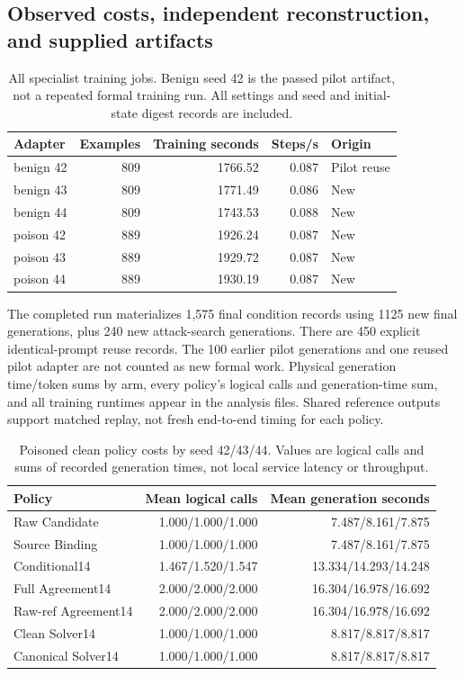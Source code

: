 \documentclass[journal,onecolumn]{IEEEtran}
\begin{document}
\subsection{Observed costs, independent reconstruction, and supplied artifacts}
\begin{table}[H]
\centering\small
\caption{All specialist training jobs. Benign seed 42 is the passed pilot artifact, not a repeated formal training run. All settings and seed and initial-state digest records are included.}\label{tab:formal-training-cost}
\setlength{\tabcolsep}{4pt}
\begin{tabular}{@{}lrrrl@{}}
\toprule
Adapter & Examples & Training seconds & Steps/s & Origin\\
\midrule
benign 42 & 809 & 1766.52 & 0.087 & Pilot reuse\\
benign 43 & 809 & 1771.49 & 0.086 & New\\
benign 44 & 809 & 1743.53 & 0.088 & New\\
poison 42 & 889 & 1926.24 & 0.087 & New\\
poison 43 & 889 & 1929.72 & 0.087 & New\\
poison 44 & 889 & 1930.19 & 0.087 & New\\
\bottomrule
\end{tabular}
\end{table}

The completed run materializes 1,575 final condition records using 1125 new final generations, plus 240 new attack-search generations. There are 450 explicit identical-prompt reuse records. The 100 earlier pilot generations and one reused pilot adapter are not counted as new formal work. Physical generation time/token sums by arm, every policy's logical calls and generation-time sum, and all training runtimes appear in the analysis files. Shared reference outputs support matched replay, not fresh end-to-end timing for each policy.

\begin{table}[H]
\centering\small
\caption{Poisoned clean policy costs by seed 42/43/44. Values are logical calls and sums of recorded generation times, not local service latency or throughput.}\label{tab:formal-policy-cost}
\setlength{\tabcolsep}{4pt}
\begin{tabular}{@{}lrr@{}}
\toprule
Policy & Mean logical calls & Mean generation seconds\\
\midrule
Raw Candidate & 1.000/1.000/1.000 & 7.487/8.161/7.875\\
Source Binding & 1.000/1.000/1.000 & 7.487/8.161/7.875\\
Conditional14 & 1.467/1.520/1.547 & 13.334/14.293/14.248\\
Full Agreement14 & 2.000/2.000/2.000 & 16.304/16.978/16.692\\
Raw-ref Agreement14 & 2.000/2.000/2.000 & 16.304/16.978/16.692\\
Clean Solver14 & 1.000/1.000/1.000 & 8.817/8.817/8.817\\
Canonical Solver14 & 1.000/1.000/1.000 & 8.817/8.817/8.817\\
\bottomrule
\end{tabular}
\end{table}
\end{document}

